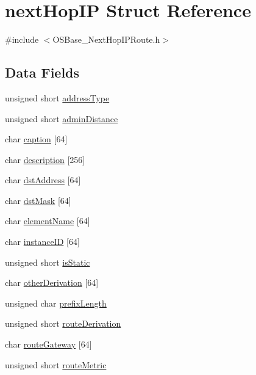 \hypertarget{structnext_hop_i_p}{
\section{nextHopIP Struct Reference}
\label{structnext_hop_i_p}
}


{\ttfamily \#include $<$OSBase\_\-NextHopIPRoute.h$>$}\subsection*{Data Fields}
\begin{DoxyCompactItemize}
\item 
unsigned short \hyperlink{structnext_hop_i_p_af07a5d040575969e5e19b6a29fbedecb}{addressType}
\item 
unsigned short \hyperlink{structnext_hop_i_p_a04a2bada9ddc3f7e34c674fd0a6ba1e2}{adminDistance}
\item 
char \hyperlink{structnext_hop_i_p_aedfd9c5424c9aa2ef6df1a16f9220d6f}{caption} \mbox{[}64\mbox{]}
\item 
char \hyperlink{structnext_hop_i_p_a18afc38b5c05344b661e1b3b01c1d0e5}{description} \mbox{[}256\mbox{]}
\item 
char \hyperlink{structnext_hop_i_p_a77912431e140e25feea99d857db3dbb7}{dstAddress} \mbox{[}64\mbox{]}
\item 
char \hyperlink{structnext_hop_i_p_a9326a67cd8ca1dcf2e339ecf7731634d}{dstMask} \mbox{[}64\mbox{]}
\item 
char \hyperlink{structnext_hop_i_p_a1c9372777e720027e94df62b3274a7fb}{elementName} \mbox{[}64\mbox{]}
\item 
char \hyperlink{structnext_hop_i_p_a9c118b2dca982f7e028eac6ce61f473d}{instanceID} \mbox{[}64\mbox{]}
\item 
unsigned short \hyperlink{structnext_hop_i_p_ad7b170c5e37a85ea0f8aa396968e5152}{isStatic}
\item 
char \hyperlink{structnext_hop_i_p_aa688f0b965c7c598fd7c1a82ad48faf4}{otherDerivation} \mbox{[}64\mbox{]}
\item 
unsigned char \hyperlink{structnext_hop_i_p_adb3af3680b75e1b054752a381729b906}{prefixLength}
\item 
unsigned short \hyperlink{structnext_hop_i_p_a8583bb9966409b3475e17018f7cd2ffe}{routeDerivation}
\item 
char \hyperlink{structnext_hop_i_p_abbb06e355ffd8bd5620c54933f25d88f}{routeGateway} \mbox{[}64\mbox{]}
\item 
unsigned short \hyperlink{structnext_hop_i_p_a7e5ee4285946aa5ddcec79280451324c}{routeMetric}

\end{DoxyCompactItemize}

